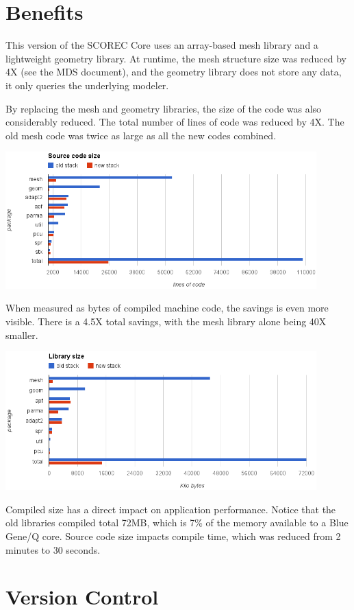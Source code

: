 \documentclass{article}
\begin{document}
\section{Benefits}

This version of the SCOREC Core uses an array-based mesh
library and a lightweight geometry library.
At runtime, the mesh structure size was reduced by 4X
(see the MDS document), and the geometry library does
not store any data, it only queries the underlying modeler.

By replacing the mesh and geometry libraries,
the size of the code was also considerably reduced.
The total number of lines of code was reduced by 4X.
The old mesh code was twice as large as all the new
codes combined.

\includegraphics[width=0.9\textwidth]{loc.png}

When measured as bytes of compiled machine code, the savings
is even more visible.
There is a 4.5X total savings, with the mesh library alone being 40X
smaller.

\includegraphics[width=0.9\textwidth]{libsize.png}

Compiled size has a direct impact on application performance.
Notice that the old libraries compiled total 72MB, which
is 7\% of the memory available to a Blue Gene/Q core.
Source code size impacts compile time, which was reduced from
2 minutes to 30 seconds.

\section{Version Control}
\end{document}
